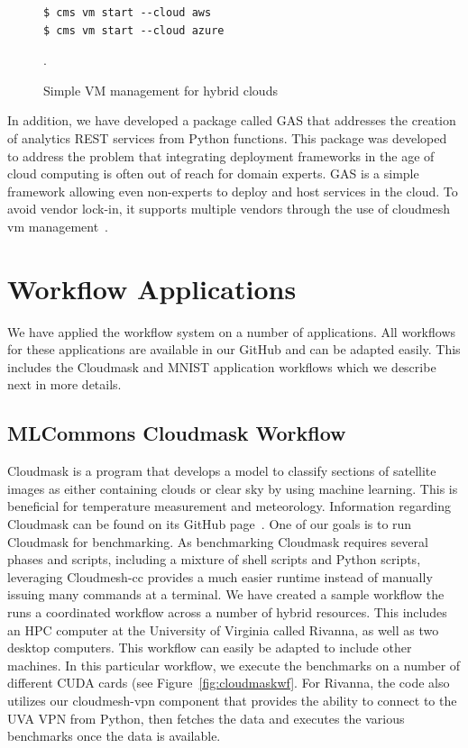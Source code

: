 \documentclass[sigplan,screen]{acmart}
\newcommand{\FILE}[1]{}
\begin{document}
\begin{figure}[htb]

\begin{verbatim}
$ cms vm start --cloud aws
$ cms vm start --cloud azure
\end{verbatim}

  \caption{Simple VM management for hybrid clouds}
\label{fig:cms}.
\end{figure}  

In addition, we have developed a package called GAS that addresses
the creation of analytics REST services from Python functions. This
package was developed to address the problem that integrating
deployment frameworks in the age of cloud computing is often out of
reach for domain experts. GAS is a simple framework allowing even
non-experts to deploy and host services in the cloud. To avoid vendor
lock-in, it supports multiple vendors through the use of cloudmesh vm
management~\cite{las21-gas}.


% 
\FILE{applications.tex}

\section{Workflow Applications}

We have applied the workflow system on a number of applications. All
workflows for these applications are available in our GitHub and can
be adapted easily. This includes the Cloudmask and MNIST application
workflows which we describe next in more details.




% 

\FILE{Cloudmask.tex}

\subsection{MLCommons Cloudmask Workflow}
\label{cloudmask-workflow}

Cloudmask is a program that develops a model to classify sections of
satellite images as either containing clouds or clear sky by using
machine learning. This is beneficial for temperature measurement and
meteorology. Information regarding Cloudmask can be found on its
GitHub page~\cite{www-cloudmask}. One of our goals is to run
Cloudmask for benchmarking. As benchmarking Cloudmask requires
several phases and scripts, including a mixture of shell scripts and
Python scripts, leveraging Cloudmesh-cc provides a much easier runtime
instead of manually issuing many commands at a terminal. We have
created a sample workflow the runs a coordinated workflow across a
number of hybrid resources. This includes an HPC computer at the
University of Virginia called Rivanna, as well as two desktop
computers. This workflow can easily be adapted to include other
machines. In this particular workflow, we execute the benchmarks on a
number of different CUDA cards (see Figure~\ref{fig:cloudmaskwf}. For
Rivanna, the code also utilizes our cloudmesh-vpn component that
provides the ability to connect to the UVA VPN from Python, then
fetches the data and executes the various benchmarks once the data is
available.
\end{document}
